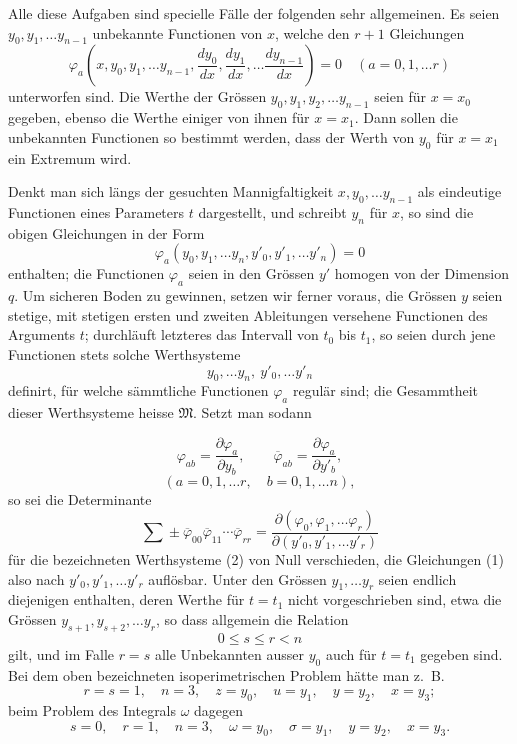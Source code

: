 \documentclass[11pt,a4paper,leqno]{article}
\begin{document}
Alle diese Aufgaben sind specielle Fälle der folgenden sehr
allgemeinen. Es seien $y_0,y_1,\ldots y_{n-1}$ unbekannte Functionen
von $x$, welche den $r+1$ Gleichungen
\[
\varphi_a\left(x,y_0,y_1,\ldots y_{n-1},
\frac{dy_0}{dx},\frac{dy_1}{dx},\ldots\frac{dy_{n-1}}{dx}\right)=0
\quad(a=0,1,\ldots r)
\]
unterworfen sind. Die Werthe der Grössen $y_0,y_1,y_2,\ldots y_{n-1}$
seien für $x=x_0$ gegeben, ebenso die Werthe einiger von ihnen für
$x=x_1$. Dann sollen die unbekannten Functionen so bestimmt werden,
dass der Werth von $y_0$ für $x=x_1$ ein Extremum wird.

Denkt man sich längs der gesuchten Mannigfaltigkeit
$x,y_0,\ldots y_{n-1}$ als eindeutige Functionen eines Parameters $t$
dargestellt, und schreibt $y_n$ für $x$, so sind die obigen Gleichungen
in der Form
\begin{equation}\tag{1}
\varphi_a(y_0,y_1,\ldots y_n,y'_0,y'_1,\ldots y'_n)=0
\end{equation}
enthalten; die Functionen $\varphi_a$ seien in den Grössen $y'$ homogen
von der Dimension $q$. Um sicheren Boden zu gewinnen, setzen wir ferner
voraus, die Grössen $y$ seien stetige, mit stetigen ersten und zweiten
Ableitungen versehene Functionen des Arguments $t$; durchläuft letzteres
das Intervall von $t_0$ bis $t_1$, so seien durch jene Functionen stets
solche Werthsysteme
\begin{equation}\tag{2}
y_0,\ldots y_n,\ y'_0,\ldots y'_n
\end{equation}
definirt, für welche sämmtliche Functionen $\varphi_a$ regulär sind;
die Gesammtheit dieser Werthsysteme heisse $\mathfrak M$. Setzt man
sodann

\[
\varphi_{ab}=\frac{\partial\varphi_a}{\partial y_b},\qquad
\overline{\varphi}_{ab}=\frac{\partial\varphi_a}{\partial y'_b},
\]
\[
(a=0,1,\ldots r,\quad b=0,1,\ldots n),
\]
so sei die Determinante
\begin{equation}\tag{3}
\sum\!\pm\overline{\varphi}_{00}\overline{\varphi}_{11}
\cdots\overline{\varphi}_{rr}
=\frac{\partial(\varphi_0,\varphi_1,\ldots\varphi_r)}
{\partial(y'_0,y'_1,\ldots y'_r)}
\end{equation}
für die bezeichneten Werthsysteme (2) von Null verschieden, die
Gleichungen (1) also nach $y'_0,y'_1,\ldots y'_r$ auflösbar. Unter den
Grössen $y_1,\ldots y_r$ seien endlich diejenigen enthalten, deren
Werthe für $t=t_1$ nicht vorgeschrieben sind, etwa die Grössen
$y_{s+1},y_{s+2},\ldots y_r$, so dass allgemein die Relation
\[
0\leq s\leq r<n
\]
gilt, und im Falle $r=s$ alle Unbekannten ausser $y_0$ auch für $t=t_1$
gegeben sind. Bei dem oben bezeichneten isoperimetrischen Problem hätte
man z.~B.
\[
r=s=1,\quad n=3,\quad z=y_0,\quad u=y_1,\quad y=y_2,\quad x=y_3;
\]
beim Problem des Integrals $\omega$ dagegen
\[
s=0,\quad r=1,\quad n=3,\quad \omega=y_0,\quad \sigma=y_1,
\quad y=y_2,\quad x=y_3.
\]
\end{document}

